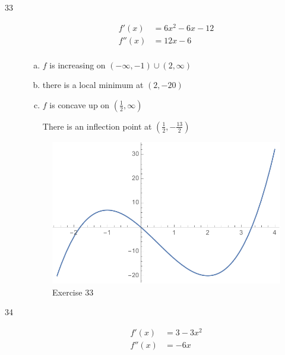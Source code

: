 \documentclass[letterpaper, landscape]{exam}
\begin{document}
\begin{description}
    \newpage

    \item[33]
      \begin{align*}
        f'(x)  & = 6x^2 - 6x - 12 \\
        f''(x) & = 12x - 6 \\
      \end{align*}

      \begin{enumerate}[(a)]
        \item $f$ is increasing on $(-\infty, -1) \cup (2, \infty)$

        \item there is a local minimum at $(2, -20)$ 

        \item $f$ is concave up on $\left( \frac{1}{2}, \infty \right)$ 
          
          There is an inflection point at $\left( \frac{1}{2}, - \frac{13}{2} \right)$ 

      \end{enumerate}

      \begin{figure}[H]
        \centering
        \includegraphics[scale = 0.6]{ex33.pdf}
        \caption{Exercise 33}
        \label{fig:ex33}
      \end{figure}

    \newpage

    \item[34]
      \begin{align*}
        f'(x)  & = 3 - 3x^2 \\
        f''(x) & = -6x \\
      \end{align*}


\end{description}
\end{document}
